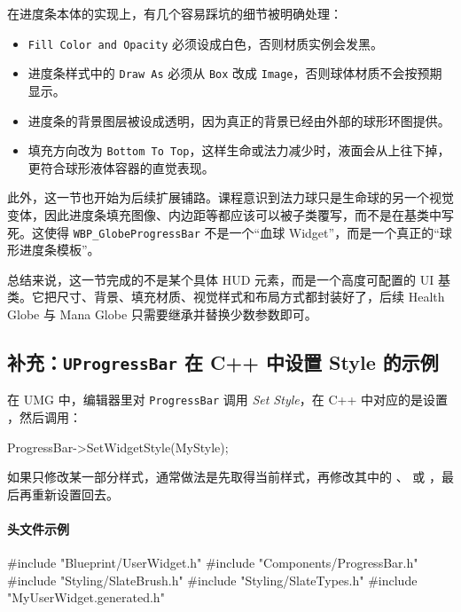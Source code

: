在进度条本体的实现上，有几个容易踩坑的细节被明确处理：
\begin{itemize}
	\item \texttt{Fill Color and Opacity} 必须设成白色，否则材质实例会发黑。
	\item 进度条样式中的 \texttt{Draw As} 必须从 \texttt{Box} 改成 \texttt{Image}，否则球体材质不会按预期显示。
	\item 进度条的背景图层被设成透明，因为真正的背景已经由外部的球形环图提供。
	\item 填充方向改为 \texttt{Bottom To Top}，这样生命或法力减少时，液面会从上往下掉，更符合球形液体容器的直觉表现。
\end{itemize}

此外，这一节也开始为后续扩展铺路。课程意识到法力球只是生命球的另一个视觉变体，因此进度条填充图像、内边距等都应该可以被子类覆写，而不是在基类中写死。这使得 \texttt{WBP\_GlobeProgressBar} 不是一个“血球 Widget”，而是一个真正的“球形进度条模板”。

总结来说，这一节完成的不是某个具体 HUD 元素，而是一个高度可配置的 UI 基类。它把尺寸、背景、填充材质、视觉样式和布局方式都封装好了，后续 Health Globe 与 Mana Globe 只需要继承并替换少数参数即可。

\subsection{补充：\texttt{UProgressBar} 在 C++ 中设置 Style 的示例}

在 UMG 中，编辑器里对 \texttt{ProgressBar} 调用 \textit{Set Style}，在 C++ 中对应的是设置
，然后调用：

\begin{code}
	ProgressBar->SetWidgetStyle(MyStyle);
\end{code}

如果只修改某一部分样式，通常做法是先取得当前样式，再修改其中的
、 或 ，最后再重新设置回去。

\paragraph{头文件示例}

\begin{code}
	#include "Blueprint/UserWidget.h"
	#include "Components/ProgressBar.h"
	#include "Styling/SlateBrush.h"
	#include "Styling/SlateTypes.h"
	#include "MyUserWidget.generated.h"
\end{code}


